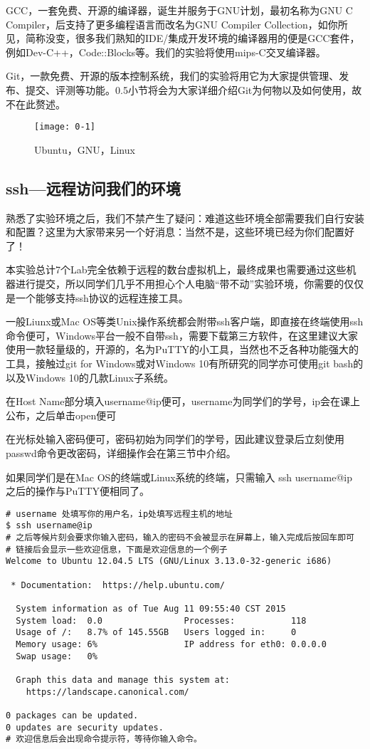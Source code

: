 GCC，一套免费、开源的编译器，诞生并服务于GNU计划，最初名称为GNU C Compiler，后支持了更多编程语言而改名为GNU Compiler Collection，如你所见，简称没变，很多我们熟知的IDE/集成开发环境的编译器用的便是GCC套件，例如Dev-C++，Code::Blocks等。我们的实验将使用mips-C交叉编译器。

Git，一款免费、开源的版本控制系统，我们的实验将用它为大家提供管理、发布、提交、评测等功能。0.5小节将会为大家详细介绍Git为何物以及如何使用，故不在此赘述。

\begin{figure}[htbp]
  \centering
  \texttt{[image: 0-1]}
  \caption{Ubuntu，GNU，Linux}\label{fig:0-1}
\end{figure}

\subsection{ssh—远程访问我们的环境}

熟悉了实验环境之后，我们不禁产生了疑问：难道这些环境全部需要我们自行安装和配置？这里为大家带来另一个好消息：当然不是，这些环境已经为你们配置好了！

本实验总计7个Lab完全依赖于远程的数台虚拟机上，最终成果也需要通过这些机器进行提交，所以同学们几乎不用担心个人电脑“带不动”实验环境，你需要的仅仅是一个能够支持ssh协议的远程连接工具。

一般Liunx或Mac OS等类Unix操作系统都会附带ssh客户端，即直接在终端使用ssh命令便可，Windows平台一般不自带ssh，需要下载第三方软件，在这里建议大家使用一款轻量级的，开源的，名为PuTTY的小工具，当然也不乏各种功能强大的工具，接触过git for Windows或对Windows 10有所研究的同学亦可使用git bash的以及Windows 10的几款Linux子系统。

在Host Name部分填入username@ip便可，username为同学们的学号，ip会在课上公布，之后单击open便可

在光标处输入密码便可，密码初始为同学们的学号，因此建议登录后立刻使用passwd命令更改密码，详细操作会在第三节中介绍。

如果同学们是在Mac OS的终端或Linux系统的终端，只需输入 ssh username@ip 之后的操作与PuTTY便相同了。

\begin{verbatim}
# username 处填写你的用户名，ip处填写远程主机的地址
$ ssh username@ip
# 之后等候片刻会要求你输入密码，输入的密码不会被显示在屏幕上，输入完成后按回车即可
# 链接后会显示一些欢迎信息，下面是欢迎信息的一个例子
Welcome to Ubuntu 12.04.5 LTS (GNU/Linux 3.13.0-32-generic i686)

 * Documentation:  https://help.ubuntu.com/

  System information as of Tue Aug 11 09:55:40 CST 2015
  System load:  0.0                Processes:           118
  Usage of /:   8.7% of 145.55GB   Users logged in:     0
  Memory usage: 6%                 IP address for eth0: 0.0.0.0
  Swap usage:   0%

  Graph this data and manage this system at:
    https://landscape.canonical.com/

0 packages can be updated.
0 updates are security updates.
# 欢迎信息后会出现命令提示符，等待你输入命令。
\end{verbatim}

